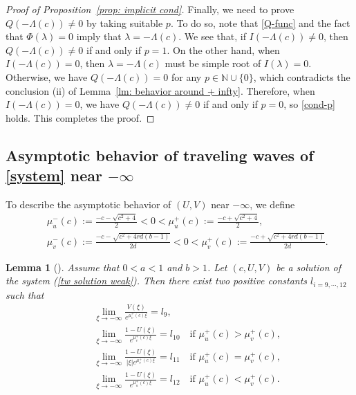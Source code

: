 \documentclass[11pt,a4paper]{article}
\newtheorem{lemma}[theorem]{\textbf{Lemma}}
\numberwithin{equation}{section}
\numberwithin{figure}{section}
\newcommand\beaa{\begin{eqnarray*}}
\newcommand\eeaa{\end{eqnarray*}}
\begin{document}
\begin{proof}[Proof of Proposition~\ref{prop: implicit cond}]
Finally, we need to prove $Q(-\Lambda(c))\neq0$ by taking suitable $p$.
To do so, note that \eqref{Q-func} and the fact that $\Phi(\lambda)=0$ imply that $\lambda=-\Lambda(c)$.
We see that, if $I(-\Lambda(c))\neq0$, then $Q(-\Lambda(c))\neq0$ if and only if $p=1$.
On the other hand, when $I(-\Lambda(c))=0$, then $\lambda=-\Lambda(c)$ must be simple root of $I(\lambda)=0$. Otherwise,
we have $Q(-\Lambda(c))=0$ for any $p\in\mathbb{N}\cup\{0\}$, which contradicts
the conclusion (ii) of Lemma~\ref{lm: behavior around + infty}. Therefore, when $I(-\Lambda(c))=0$,
we have $Q(-\Lambda(c))\neq0$ if and only if $p=0$, so \eqref{cond-p} holds.
This completes the proof.
\end{proof}


\subsection{Asymptotic behavior of traveling waves of \eqref{system} near $-\infty$}\label{subsec:Asymp behavior -}
To describe the asymptotic behavior of $(U,V)$ near $-\infty$, we define
\beaa
&&\mu_{u}^{-}(c):=\frac{-c-\sqrt{c^2+4}}{2}<0<\mu_{u}^{+}(c):=\frac{-c+\sqrt{c^2+4}}{2},\\
&&\mu_v^{-}(c):=\frac{-c-\sqrt{c^2+4rd(b-1)}}{2d}<0<\mu_v^{+}(c):=\frac{-c+\sqrt{c^2+4rd(b-1)}}{2d}.
\eeaa

\begin{lemma}[\cite{MoritaTachibana2009}]\label{lem:AS-infty:b>1}
Assume that $0<a<1$ and $b>1$.
Let $(c,U,V)$ be a solution of the system (\ref{tw solution weak}). Then
there exist two positive constants $l_{i=9,\cdots,12}$ such that
\beaa
&& \lim_{\xi\rightarrow-\infty}\frac{V(\xi)}{e^{\mu_v^+(c)\xi}}=l_9,\\
&&\lim_{\xi\rightarrow-\infty}\frac{1-U(\xi)}{e^{\mu_v^+(c)\xi}}=l_{10}\quad \mbox{if $\mu_{u}^{+}(c)>\mu_v^+(c)$},\\
&&\lim_{\xi\rightarrow-\infty}\frac{1-U(\xi)}{|\xi|e^{\mu_v^+(c)\xi}}=l_{11}\quad
\mbox{if $\mu_{u}^{+}(c)=\mu_v^+(c)$},\\
&&\lim_{\xi\rightarrow-\infty}\frac{1-U(\xi)}{e^{\mu_u^+(c)\xi}}=l_{12}\quad \mbox{if $\mu_{u}^{+}(c)<\mu_v^+(c)$}.
\eeaa
\end{lemma}
\end{document}
